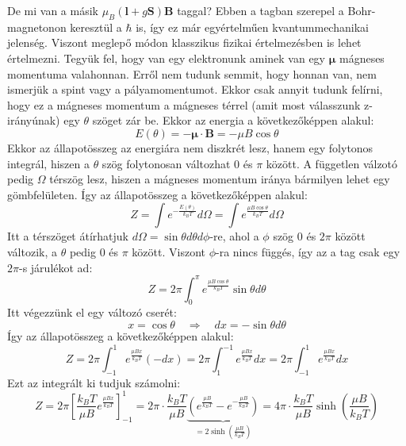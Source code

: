 \documentclass[../main.tex]{subfiles}
\begin{document}
De mi van a másik $\mu_B \left(\mathbf{l} + g \mathbf{S}\right) \mathbf{B}$ taggal? Ebben a tagban szerepel a Bohr-magnetonon keresztül a $\hbar$ is, így ez már egyértelműen kvantummechanikai jelenség.
Viszont meglepő módon klasszikus fizikai értelmezésben is lehet értelmezni. Tegyük fel, hogy van egy elektronunk aminek van egy $\boldsymbol{\mu}$ mágneses momentuma valahonnan. Erről nem tudunk semmit, hogy
honnan van, nem ismerjük a spint vagy a pályamomentumot. Ekkor csak annyit tudunk felírni, hogy ez a mágneses momentum a mágneses térrel (amit most válasszunk z-irányúnak) egy $\theta$ szöget zár be.
Ekkor az energia a következőképpen alakul:
\begin{equation}
    E(\theta) = - \boldsymbol{\mu} \cdot \mathbf{B} = - \mu B \cos \theta
\end{equation}
Ekkor az állapotösszeg az energiára nem diszkrét lesz, hanem egy folytonos integrál, hiszen a $\theta$ szög folytonosan változhat $0$ és $\pi$ között. A független válzotó pedig $\Omega$ térszög lesz, hiszen a mágneses momentum iránya
bármilyen lehet egy gömbfelületen. Így az állapotösszeg a következőképpen alakul:
\begin{equation}
    Z = \int e^{-\frac{E(\theta)}{k_B T}} d\Omega = \int e^{\frac{\mu B \cos \theta}{k_B T}} d\Omega
\end{equation}
Itt a térszöget átírhatjuk $d\Omega = \sin \theta d\theta d\phi$-re, ahol a $\phi$ szög $0$ és $2\pi$ között változik, a $\theta$ pedig $0$ és $\pi$ között. Viszont $\phi$-ra nincs függés, így az a tag csak egy $2\pi$-s járulékot ad:
\begin{equation}
    Z = 2\pi \int_0^\pi e^{\frac{\mu B \cos \theta}{k_B T}} \sin \theta d\theta
\end{equation}
Itt végezzünk el egy változó cserét:
\begin{equation}
    x = \cos \theta \quad \Rightarrow \quad dx = - \sin \theta d\theta
\end{equation}
Így az állapotösszeg a következőképpen alakul:
\begin{equation}
    Z = 2\pi \int_{-1}^{1} e^{\frac{\mu B x}{k_B T}} (-dx) = 2\pi \int_{1}^{-1} e^{\frac{\mu B x}{k_B T}} dx = 2\pi \int_{-1}^{1} e^{\frac{\mu B x}{k_B T}} dx
\end{equation}
Ezt az integrált ki tudjuk számolni:
\begin{equation}
    Z = 2\pi \left[ \frac{k_B T}{\mu B} e^{\frac{\mu B x}{k_B T}} \right]_{-1}^{1} = 2\pi \cdot \frac{k_B T}{\mu B} \underbrace{\left( e^{\frac{\mu B}{k_B T}} - e^{-\frac{\mu B}{k_B T}} \right)}_{= 2\sinh \left( \frac{\mu B}{k_B T} \right)} = 4\pi \cdot \frac{k_B T}{\mu B} \sinh \left( \frac{\mu B}{k_B T} \right)
\end{equation}
\end{document}
